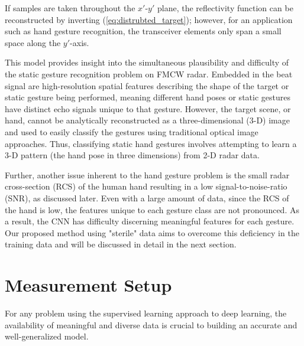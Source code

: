 \documentclass{ieeeaccess}
\begin{document}
If samples are taken throughout the $x'$-$y'$ plane, the reflectivity function can be reconstructed by inverting (\ref{eq:distrubted_target}); however, for an application such as hand gesture recognition, the transceiver elements only span a small space along the $y'$-axis. 

This model provides insight into the simultaneous plausibility and difficulty of the static gesture recognition problem on FMCW radar. Embedded in the beat signal are high-resolution spatial features describing the shape of the target or static gesture being performed, meaning different hand poses or static gestures have distinct echo signals unique to that gesture. However, the target scene, or hand, cannot be analytically reconstructed as a three-dimensional (3-D) image and used to easily classify the gestures using traditional optical image approaches. Thus, classifying static hand gestures involves attempting to learn a 3-D pattern (the hand pose in three dimensions) from 2-D radar data. 

Further, another issue inherent to the hand gesture problem is the small radar cross-section (RCS) of the human hand resulting in a low signal-to-noise-ratio (SNR), as discussed later. Even with a large amount of data, since the RCS of the hand is low, the features unique to each gesture class are not pronounced. As a result, the CNN has difficulty discerning meaningful features for each gesture. Our proposed method using "sterile" data aims to overcome this deficiency in the training data and will be discussed in detail in the next section.

\section{Measurement Setup}
\label{sec:measurement_setup}
For any problem using the supervised learning approach to deep learning, the availability of meaningful and diverse data is crucial to building an accurate and well-generalized model. 
\end{document}
